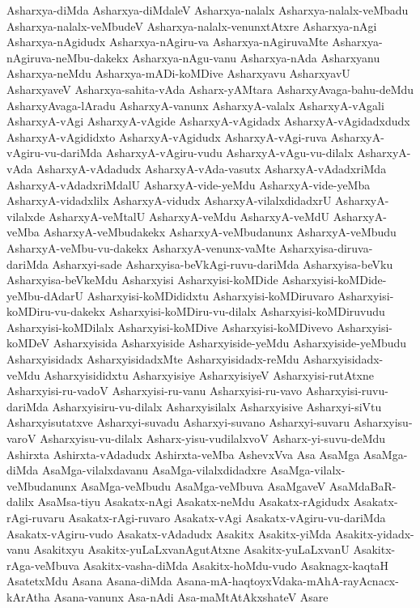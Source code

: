 {Asharxya-diMda
Asharxya-diMdaleV
Asharxya-nalalx
Asharxya-nalalx-veMbadu
Asharxya-nalalx-veMbudeV
Asharxya-nalalx-venunxtAtxre
Asharxya-nAgi
Asharxya-nAgidudx
Asharxya-nAgiru-va
Asharxya-nAgiruvaMte
Asharxya-nAgiruva-neMbu-dakekx
Asharxya-nAgu-vanu
Asharxya-nAda
Asharxyanu
Asharxya-neMdu
Asharxya-mADi-koMDive
Asharxyavu
AsharxyavU
AsharxyaveV
Asharxya-sahita-vAda
Asharx-yAMtara
AsharxyAvaga-bahu-deMdu
AsharxyAvaga-lAradu
AsharxyA-vanunx
AsharxyA-valalx
AsharxyA-vAgali
AsharxyA-vAgi
AsharxyA-vAgide
AsharxyA-vAgidadx
AsharxyA-vAgidadxdudx
AsharxyA-vAgididxto
AsharxyA-vAgidudx
AsharxyA-vAgi-ruva
AsharxyA-vAgiru-vu-dariMda
AsharxyA-vAgiru-vudu
AsharxyA-vAgu-vu-dilalx
AsharxyA-vAda
AsharxyA-vAdadudx
AsharxyA-vAda-vasutx
AsharxyA-vAdadxriMda
AsharxyA-vAdadxriMdalU
AsharxyA-vide-yeMdu
AsharxyA-vide-yeMba
AsharxyA-vidadxlilx
AsharxyA-vidudx
AsharxyA-vilalxdidadxrU
AsharxyA-vilalxde
AsharxyA-veMtalU
AsharxyA-veMdu
AsharxyA-veMdU
AsharxyA-veMba
AsharxyA-veMbudakekx
AsharxyA-veMbudanunx
AsharxyA-veMbudu
AsharxyA-veMbu-vu-dakekx
AsharxyA-venunx-vaMte
Asharxyisa-diruva-dariMda
Asharxyi-sade
Asharxyisa-beVkAgi-ruvu-dariMda
Asharxyisa-beVku
Asharxyisa-beVkeMdu
Asharxyisi
Asharxyisi-koMDide
Asharxyisi-koMDide-yeMbu-dAdarU
Asharxyisi-koMDididxtu
Asharxyisi-koMDiruvaro
Asharxyisi-koMDiru-vu-dakekx
Asharxyisi-koMDiru-vu-dilalx
Asharxyisi-koMDiruvudu
Asharxyisi-koMDilalx
Asharxyisi-koMDive
Asharxyisi-koMDivevo
Asharxyisi-koMDeV
Asharxyisida
Asharxyiside
Asharxyiside-yeMdu
Asharxyiside-yeMbudu
Asharxyisidadx
AsharxyisidadxMte
Asharxyisidadx-reMdu
Asharxyisidadx-veMdu
Asharxyisididxtu
Asharxyisiye
AsharxyisiyeV
Asharxyisi-rutAtxne
Asharxyisi-ru-vadoV
Asharxyisi-ru-vanu
Asharxyisi-ru-vavo
Asharxyisi-ruvu-dariMda
Asharxyisiru-vu-dilalx
Asharxyisilalx
Asharxyisive
Asharxyi-siVtu
Asharxyisutatxve
Asharxyi-suvadu
Asharxyi-suvano
Asharxyi-suvaru
Asharxyisu-varoV
Asharxyisu-vu-dilalx
Asharx-yisu-vudilalxvoV
Asharx-yi-suvu-deMdu
Ashirxta
Ashirxta-vAdadudx
Ashirxta-veMba
AshevxVva
Asa
AsaMga
AsaMga-diMda
AsaMga-vilalxdavanu
AsaMga-vilalxdidadxre
AsaMga-vilalx-veMbudanunx
AsaMga-veMbudu
AsaMga-veMbuva
AsaMgaveV
AsaMdaBaR-dalilx
AsaMsa-tiyu
Asakatx-nAgi
Asakatx-neMdu
Asakatx-rAgidudx
Asakatx-rAgi-ruvaru
Asakatx-rAgi-ruvaro
Asakatx-vAgi
Asakatx-vAgiru-vu-dariMda
Asakatx-vAgiru-vudo
Asakatx-vAdadudx
Asakitx
Asakitx-yiMda
Asakitx-yidadx-vanu
Asakitxyu
Asakitx-yuLaLxvanAgutAtxne
Asakitx-yuLaLxvanU
Asakitx-rAga-veMbuva
Asakitx-vasha-diMda
Asakitx-hoMdu-vudo
Asaknagx-kaqtaH
AsatetxMdu
Asana
Asana-diMda
Asana-mA-haqtoyxVdaka-mAhA-rayAcnacx-kArAtha
Asana-vanunx
Asa-nAdi
Asa-maMtAtAkxshateV
Asare
}
